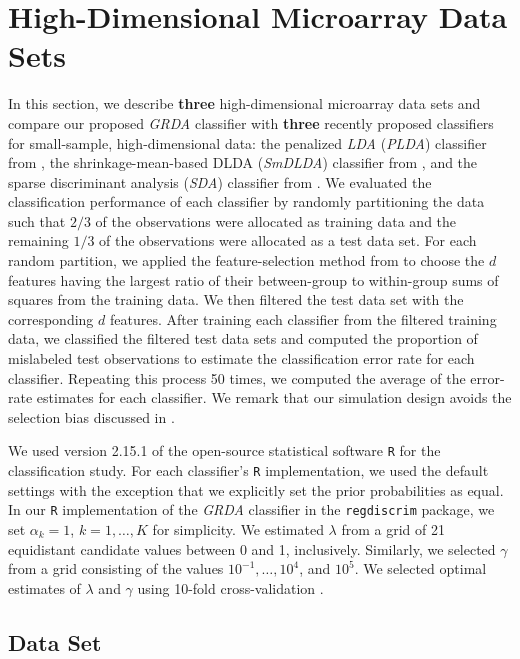 \documentclass[11pt]{article}
\begin{document}
\section{High-Dimensional Microarray Data Sets}

In this section, we describe \textbf{three} high-dimensional microarray data sets and compare our proposed \emph{GRDA} classifier with \textbf{three} recently proposed classifiers for small-sample, high-dimensional data: the penalized \emph{LDA} (\emph{PLDA}) classifier from \cite{Witten:2011kc}, the shrinkage-mean-based DLDA (\emph{SmDLDA}) classifier from \cite{Tong:2012hw}, and the sparse discriminant analysis (\emph{SDA}) classifier from \cite{Clemmensen:2011kr}. We evaluated the classification performance of each classifier by randomly partitioning the data such that $2/3$ of the observations were allocated as training data and the remaining $1/3$ of the observations were allocated as a test data set. For each random partition, we applied the feature-selection method from \cite{Dudoit:2002ev} to choose the $d$ features having the largest ratio of their between-group to within-group sums of squares from the training data. We then filtered the test data set with the corresponding $d$ features. After training each classifier from the filtered training data, we classified the filtered test data sets and computed the proportion of mislabeled test observations to estimate the classification error rate for each classifier. Repeating this process 50 times, we computed the average of the error-rate estimates for each classifier. We remark that our simulation design avoids the selection bias discussed in \cite{Ambroise:2002fa}.

We used version 2.15.1 of the open-source statistical software {\tt R} for the classification study. For each classifier's {\tt R} implementation, we used the default settings with the exception that we explicitly set the prior probabilities as equal. In our {\tt R} implementation of the \emph{GRDA} classifier in the {\tt regdiscrim} package, we set $\alpha_k = 1$, $k = 1, \ldots, K$ for simplicity. We estimated $\lambda$ from a grid of 21 equidistant candidate values between 0 and 1, inclusively. Similarly, we selected $\gamma$ from a grid consisting of the values $10^{-1}, \ldots, 10^4$, and $10^5$. We selected optimal estimates of $\lambda$ and $\gamma$ using 10-fold cross-validation \citep{Hastie:2008dt}.



\subsection{\cite{Burczynski:2006ik} Data Set}
\end{document}
